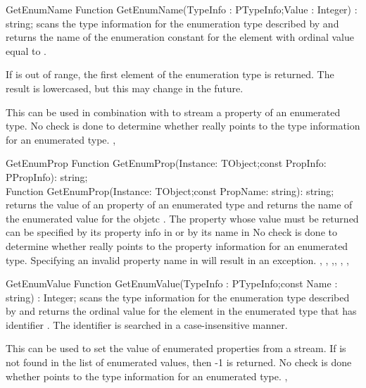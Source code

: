 
\begin{function}{GetEnumName}
\Declaration
Function GetEnumName(TypeInfo : PTypeInfo;Value : Integer) : string;
\Description
{} scans the type information for the enumeration type
described by  and returns the name of the enumeration 
constant for the element with ordinal value equal to .

If  is out of range, the first element of the enumeration type
is returned. The result is lowercased, but this may change in the future.

This can be used in combination with  to stream a property
of an enumerated type.
\Errors
No check is done to determine whether  really points to the 
type information for an enumerated type. 
\SeeAlso
{}, 
\end{function}


\begin{function}{GetEnumProp}
\Declaration
Function GetEnumProp(Instance: TObject;const PropInfo: PPropInfo): string;\\
Function GetEnumProp(Instance: TObject;const PropName: string): string;       
\Description
{} returns the value of an property of an enumerated type
and returns the name of the enumerated value for the objetc . 
The property whose value must be returned can be specified by its property 
info in  or by its name in 
\Errors
No check is done to determine whether  really points to the 
property information for an enumerated type. 
Specifying an invalid property name in  will result in an
 exception.
\SeeAlso
{} , ,
,, ,
, 
\end{function}


\begin{function}{GetEnumValue}
\Declaration
Function GetEnumValue(TypeInfo : PTypeInfo;const Name : string) : Integer;
\Description
{} scans the type information for the enumeration type
described by  and returns the ordinal value for the element
in the enumerated type that has identifier . The identifier is
searched in a case-insensitive manner.

This can be used to set the value of enumerated properties from a stream. 
\Errors
If  is not found in the list of enumerated values, then -1 is
returned. No check is done whether  points to the type information
for an enumerated type. 
\SeeAlso
{}, 
\end{function}

